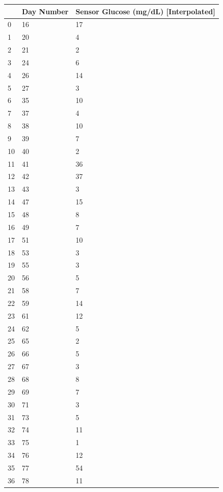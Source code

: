 \bigskip\noindent
\begin{tabular}{p{}p{}p{}}
\toprule
 & Day Number & Sensor Glucose (mg/dL) [Interpolated] \\
\hline
0 & 16 & 17 \\
\hline
1 & 20 & 4 \\
\hline
2 & 21 & 2 \\
\hline
3 & 24 & 6 \\
\hline
4 & 26 & 14 \\
\hline
5 & 27 & 3 \\
\hline
6 & 35 & 10 \\
\hline
7 & 37 & 4 \\
\hline
8 & 38 & 10 \\
\hline
9 & 39 & 7 \\
\hline
10 & 40 & 2 \\
\hline
11 & 41 & 36 \\
\hline
12 & 42 & 37 \\
\hline
13 & 43 & 3 \\
\hline
14 & 47 & 15 \\
\hline
15 & 48 & 8 \\
\hline
16 & 49 & 7 \\
\hline
17 & 51 & 10 \\
\hline
18 & 53 & 3 \\
\hline
19 & 55 & 3 \\
\hline
20 & 56 & 5 \\
\hline
21 & 58 & 7 \\
\hline
22 & 59 & 14 \\
\hline
23 & 61 & 12 \\
\hline
24 & 62 & 5 \\
\hline
25 & 65 & 2 \\
\hline
26 & 66 & 5 \\
\hline
27 & 67 & 3 \\
\hline
28 & 68 & 8 \\
\hline
29 & 69 & 7 \\
\hline
30 & 71 & 3 \\
\hline
31 & 73 & 5 \\
\hline
32 & 74 & 11 \\
\hline
33 & 75 & 1 \\
\hline
34 & 76 & 12 \\
\hline
35 & 77 & 54 \\
\hline
36 & 78 & 11 \\
\hline

\end{tabular}
